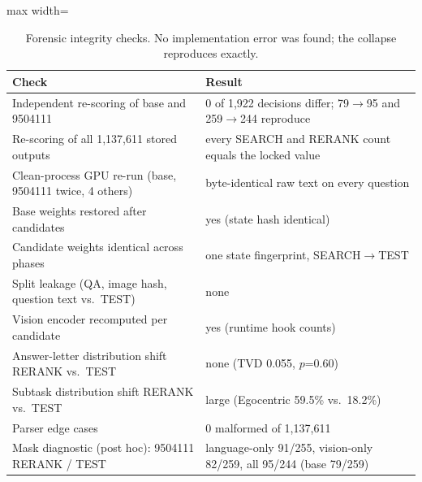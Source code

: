 \begin{table}[t]
\centering
\small
\begin{adjustbox}{max width=\linewidth}
\begin{tabular}{p{6.3cm}p{6.3cm}}
\toprule
Check & Result \\
\midrule
Independent re-scoring of base and 9504111 & 0 of 1,922 decisions differ; 79$\to$95 and 259$\to$244 reproduce \\
Re-scoring of all 1,137,611 stored outputs & every SEARCH and RERANK count equals the locked value \\
Clean-process GPU re-run (base, 9504111 twice, 4 others) & byte-identical raw text on every question \\
Base weights restored after candidates & yes (state hash identical) \\
Candidate weights identical across phases & one state fingerprint, SEARCH$\to$TEST \\
Split leakage (QA, image hash, question text vs.\ TEST) & none \\
Vision encoder recomputed per candidate & yes (runtime hook counts) \\
Answer-letter distribution shift RERANK vs.\ TEST & none (TVD 0.055, $p$=0.60) \\
Subtask distribution shift RERANK vs.\ TEST & large (Egocentric 59.5\% vs.\ 18.2\%) \\
Parser edge cases & 0 malformed of 1,137,611 \\
Mask diagnostic (post hoc): 9504111 RERANK / TEST & language-only 91/255, vision-only 82/259, all 95/244 (base 79/259) \\
\bottomrule
\end{tabular}
\end{adjustbox}
\caption{Forensic integrity checks. No implementation error was found; the collapse reproduces exactly.}
\label{tab:forensic}
\end{table}
